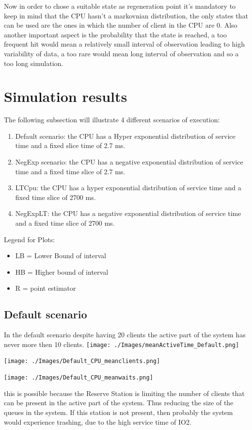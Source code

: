 \documentclass[12pt,a4paper]{article}
\begin{document}
Now in order to chose a suitable state as regeneration point it's mandatory to keep in mind that the CPU hasn't a markovnian distribution, the only states that can be used are the ones in which the number of client in the CPU are 0. Also another important aspect is the probability that the state is reached, a too frequent hit would mean a relatively small interval of observation leading to high variability of data, a too rare would mean long interval of observation and so a too long simulation. 


\section{Simulation results}
The following subsection will illustrate 4 different scenarios of execution:
\begin{enumerate}
    \item Default scenario: the CPU has a Hyper exponential distribution of service time and a fixed slice time of 2.7 ms.
    \item NegExp scenario: the CPU has a negative exponential distribution of service time and a fixed time slice of 2.7 ms.
    \item LTCpu: the CPU has a hyper exponential distribution of service time and a fixed time slice of 2700 ms.
    \item NegExpLT: the CPU has a negative exponential distribution of service time and a fixed time slice of 2700 ms.
\end{enumerate}
Legend for Plots:
\begin{itemize}
    \item LB = Lower Bound of interval 
    \item HB = Higher bound of interval 
    \item R = point estimator
\end{itemize}

\subsection{Default scenario}
In the default scenario despite having 20 clients the active part of the system has never more then 10 clients.
\texttt{[image: ./Images/meanActiveTime\_Default.png]}

\texttt{[image: ./Images/Default\_CPU\_meanclients.png]}

\texttt{[image: ./Images/Default\_CPU\_meanwaits.png]}

this is possible because the Reserve Station is limiting the number of clients that can be present in the active part of the system. Thus reducing the size of the queues in the system. If this station is not present, then probably the system would experience trashing, due to the high service time of IO2.
\end{document}
